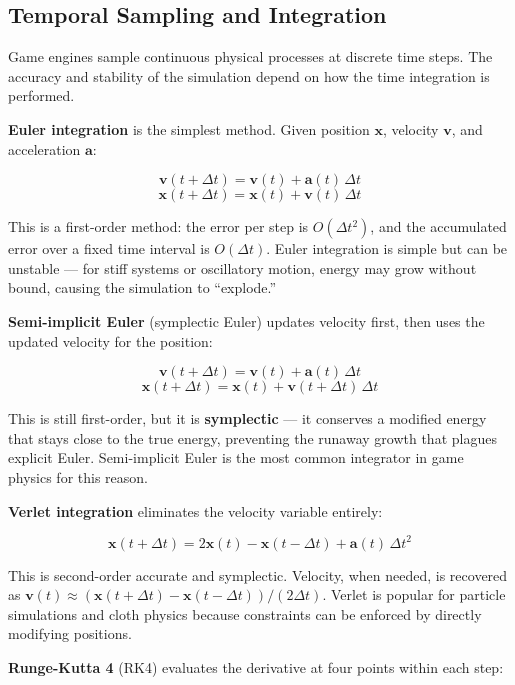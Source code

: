 \documentclass[
  11pt,
  letterpaper,
  DIV=11,
  numbers=noendperiod,
  twoside,
  open=right]{scrreprt}
\begin{document}
\subsection{Temporal Sampling and
Integration}\label{temporal-sampling-and-integration}

Game engines sample continuous physical processes at discrete time
steps. The accuracy and stability of the simulation depend on how the
time integration is performed.

\textbf{Euler integration} is the simplest method. Given position
\(\mathbf{x}\), velocity \(\mathbf{v}\), and acceleration
\(\mathbf{a}\):

\[
\mathbf{v}(t + \Delta t) = \mathbf{v}(t) + \mathbf{a}(t) \, \Delta t
\] \[
\mathbf{x}(t + \Delta t) = \mathbf{x}(t) + \mathbf{v}(t) \, \Delta t
\]

This is a first-order method: the error per step is \(O(\Delta t^2)\),
and the accumulated error over a fixed time interval is \(O(\Delta t)\).
Euler integration is simple but can be unstable --- for stiff systems or
oscillatory motion, energy may grow without bound, causing the
simulation to ``explode.''

\textbf{Semi-implicit Euler} (symplectic Euler) updates velocity first,
then uses the updated velocity for the position:

\[
\mathbf{v}(t + \Delta t) = \mathbf{v}(t) + \mathbf{a}(t) \, \Delta t
\] \[
\mathbf{x}(t + \Delta t) = \mathbf{x}(t) + \mathbf{v}(t + \Delta t) \, \Delta t
\]

This is still first-order, but it is \textbf{symplectic} --- it
conserves a modified energy that stays close to the true energy,
preventing the runaway growth that plagues explicit Euler. Semi-implicit
Euler is the most common integrator in game physics for this reason.

\textbf{Verlet integration} eliminates the velocity variable entirely:

\[
\mathbf{x}(t + \Delta t) = 2 \mathbf{x}(t) - \mathbf{x}(t - \Delta t) + \mathbf{a}(t) \, \Delta t^2
\]

This is second-order accurate and symplectic. Velocity, when needed, is
recovered as
\(\mathbf{v}(t) \approx (\mathbf{x}(t + \Delta t) - \mathbf{x}(t - \Delta t)) / (2\Delta t)\).
Verlet is popular for particle simulations and cloth physics because
constraints can be enforced by directly modifying positions.

\textbf{Runge-Kutta 4} (RK4) evaluates the derivative at four points
within each step:
\end{document}
